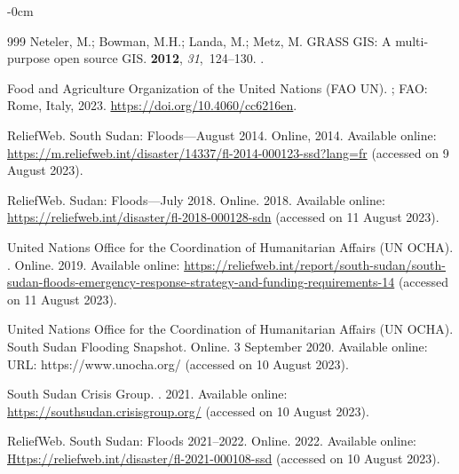 \documentclass[analytics,article,accept,pdftex,moreauthors]{Definitions/mdpi}
\begin{document}
\begin{adjustwidth}{-\extralength}{0cm}
\begin{thebibliography}{999}
Neteler, M.; Bowman, M.H.; Landa, M.; Metz, M.
\newblock GRASS GIS: A multi-purpose open source GIS.
 {\bf 2012}, {\em
  31},~124--130.
.

{Food and Agriculture Organization of the United Nations (FAO UN)}.
; FAO: Rome,
  Italy,  2023.
\newblock \url{https://doi.org/10.4060/cc6216en}.

ReliefWeb.
\newblock South Sudan: Floods---August 2014.
\newblock Online,  2014.
\newblock Available online: \url{https://m.reliefweb.int/disaster/14337/fl-2014-000123-ssd?lang=fr} (accessed on 9 August 2023).

ReliefWeb.
\newblock Sudan: Floods---July 2018.
\newblock Online.  2018.
\newblock Available online: \url{https://reliefweb.int/disaster/fl-2018-000128-sdn} (accessed on 11 August 2023).

{United Nations Office for the Coordination of Humanitarian Affairs (UN OCHA)}.
.
\newblock Online.  2019.
\newblock
  Available online: \url{https://reliefweb.int/report/south-sudan/south-sudan-floods-emergency-response-strategy-and-funding-requirements-14} (accessed on 11 August 2023).

{United Nations Office for the Coordination of Humanitarian Affairs (UN OCHA)}.
\newblock South Sudan Flooding Snapshot.
\newblock Online.  3 September 2020.
\newblock Available online: URL: https://www.unocha.org/ (accessed on 10 August 2023). %

{South Sudan Crisis Group}.
. 2021.
\newblock Available online: \url{https://southsudan.crisisgroup.org/} (accessed on 10 August 2023).

ReliefWeb.
\newblock South Sudan: Floods 2021--2022.
\newblock Online.  2022.
\newblock Available online: \url{Https://reliefweb.int/disaster/fl-2021-000108-ssd} (accessed on 10 August 2023).


\end{thebibliography}
\end{adjustwidth}
\end{document}
